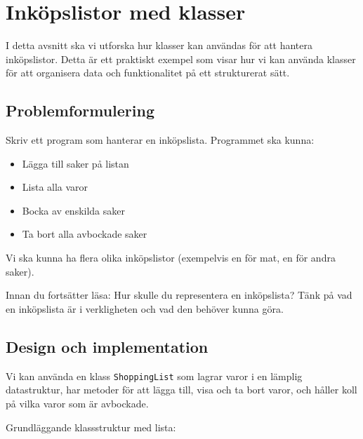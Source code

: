 \mode*

\section{Inköpslistor med klasser}

I detta avsnitt ska vi utforska hur klasser kan användas för att hantera 
inköpslistor. Detta är ett praktiskt exempel som visar hur vi kan använda 
klasser för att organisera data och funktionalitet på ett strukturerat sätt.

\subsection{Problemformulering}

\begin{exercise}
  Skriv ett program som hanterar en inköpslista. Programmet ska kunna:
  \begin{itemize}
    \item Lägga till saker på listan
    \item Lista alla varor
    \item Bocka av enskilda saker
    \item Ta bort alla avbockade saker
  \end{itemize}
  Vi ska kunna ha flera olika inköpslistor (exempelvis en för mat, en för 
  andra saker).
\end{exercise}

\begin{exercise}
  Innan du fortsätter läsa: Hur skulle du representera en inköpslista?
  Tänk på vad en inköpslista är i verkligheten och vad den behöver kunna göra.
\end{exercise}

\subsection{Design och implementation}

Vi kan använda en klass \texttt{ShoppingList} som lagrar varor 
i en lämplig datastruktur, har metoder för att lägga till, visa och ta bort 
varor, och håller koll på vilka varor som är avbockade.

\begin{frame}[fragile]
  \begin{example}
    Grundläggande klassstruktur med lista:
    \inputminted[linenos,firstline=3,lastline=14]{python}{examples/shopping.py}
  \end{example}
\end{frame}


